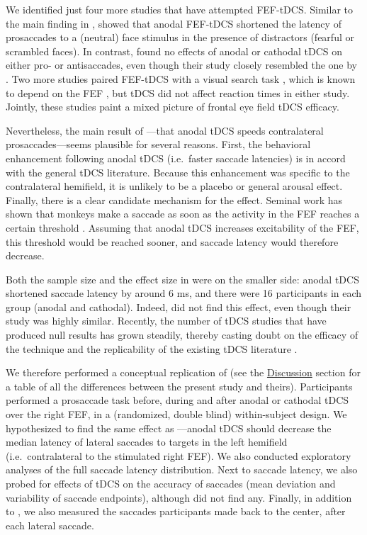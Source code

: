 \documentclass[11pt,]{memoir}
\begin{document}
We identified just four more studies that have attempted FEF-tDCS. Similar to the main finding in \textcite{Kanai2012}, \textcite{Tseng2014} showed that anodal FEF-tDCS shortened the latency of prosaccades to a (neutral) face stimulus in the presence of distractors (fearful or scrambled faces). In contrast, \textcite{Chen2017} found no effects of anodal or cathodal tDCS on either pro- or antisaccades, even though their study closely resembled the one by \textcite{Kanai2012}. Two more studies paired FEF-tDCS with a visual search task \autocites{Ball2013}{Ellison2017}, which is known to depend on the FEF \autocite{Reynolds2004}, but tDCS did not affect reaction times in either study. Jointly, these studies paint a mixed picture of frontal eye field tDCS efficacy.

Nevertheless, the main result of \textcite{Kanai2012}---that anodal tDCS speeds contralateral prosaccades---seems plausible for several reasons. First, the behavioral enhancement following anodal tDCS (i.e.~faster saccade latencies) is in accord with the general tDCS literature. Because this enhancement was specific to the contralateral hemifield, it is unlikely to be a placebo or general arousal effect. Finally, there is a clear candidate mechanism for the effect. Seminal work has shown that monkeys make a saccade as soon as the activity in the FEF reaches a certain threshold \autocite{Hanes1996}. Assuming that anodal tDCS increases excitability of the FEF, this threshold would be reached sooner, and saccade latency would therefore decrease.

Both the sample size and the effect size in \textcite{Kanai2012} were on the smaller side: anodal tDCS shortened saccade latency by around 6 ms, and there were 16 participants in each group (anodal and cathodal). Indeed, \textcite{Chen2017} did not find this effect, even though their study was highly similar. Recently, the number of tDCS studies that have produced null results has grown steadily, thereby casting doubt on the efficacy of the technique and the replicability of the existing tDCS literature \autocites{Horvath2014b}{Horvath2015}{Medina2017}.

We therefore performed a conceptual replication of \textcite{Kanai2012} (see the \protect\hyperlink{sacc_tDCS-discussion}{Discussion} section for a table of all the differences between the present study and theirs). Participants performed a prosaccade task before, during and after anodal or cathodal tDCS over the right FEF, in a (randomized, double blind) within-subject design. We hypothesized to find the same effect as \textcite{Kanai2012}---anodal tDCS should decrease the median latency of lateral saccades to targets in the left hemifield (i.e.~contralateral to the stimulated right FEF). We also conducted exploratory analyses of the full saccade latency distribution. Next to saccade latency, we also probed for effects of tDCS on the accuracy of saccades (mean deviation and variability of saccade endpoints), although \textcite{Kanai2012} did not find any. Finally, in addition to \textcite{Kanai2012}, we also measured the saccades participants made back to the center, after each lateral saccade.
\end{document}
